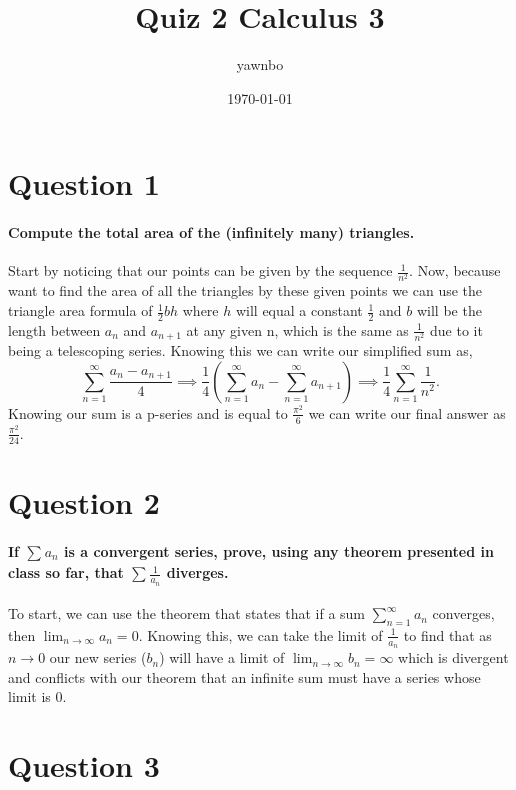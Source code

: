 \documentclass[a4paper]{article}
\title{Quiz 2 Calculus 3}
\author{yawnbo}
\date{\today}
\begin{document}
\maketitle
\section{Question 1 }%
\paragraph{Compute the total area of the (infinitely many) triangles.\\}

Start by noticing that our points can be given by the sequence $ \frac{ 1 }{ n^2 }  $. Now, because want to find the area of all the triangles by these given points we can use the triangle area formula of $ \frac{ 1 }{ 2 } bh $ where $ h $ will equal a constant $ \frac{ 1 }{ 2 }  $ and $ b $ will be the length between $ a_n $ and $ a_{ n+1 }$ at any given n, which is the same as $ \frac{ 1 }{ n^2 }  $ due to it being a telescoping series. Knowing this we can write our simplified sum as,
\[
\sum_{ n=1 } ^{ \infty } \frac{ a_n-a_{ n+1 } }{ 4 } \implies \frac{ 1 }{ 4 } \left( \sum_{ n=1 } ^{ \infty } a_n  - \sum_{ n=1 } ^{ \infty } a_{ n+1 } \right) \implies \frac{ 1 }{ 4 } \sum_{ n=1 } ^{ \infty } \frac{ 1 }{ n^2 } 
.\] 
Knowing our sum is a p-series and is equal to $ \frac{ \pi^2 }{ 6 }$ we can write our final answer as $ \frac{ \pi^2 }{ 24 }  $.

\section{Question 2 }%
\paragraph{If $ \sum_{  } ^{  } a_n $ is a convergent series, prove, using any theorem presented in class so far, that $ \sum_{  } ^{  } \frac{ 1 }{ a_n }  $ diverges. \\}

To start, we can use the theorem that states that if a sum $ \sum_{ n=1 } ^{ \infty } a_n $ converges, then $ \lim_{ n \to \infty} a_n=0 $. Knowing this, we can take the limit of $ \frac{ 1 }{ a_n }  $ to find that as $ n \to 0 $ our new series ($ b_n $) will have a limit of $ \lim_{ n \to \infty} b_n=\infty $ which is divergent and conflicts with our theorem that an infinite sum must have a series whose limit is 0.
\newpage
\section{Question 3 }%
\end{document}
